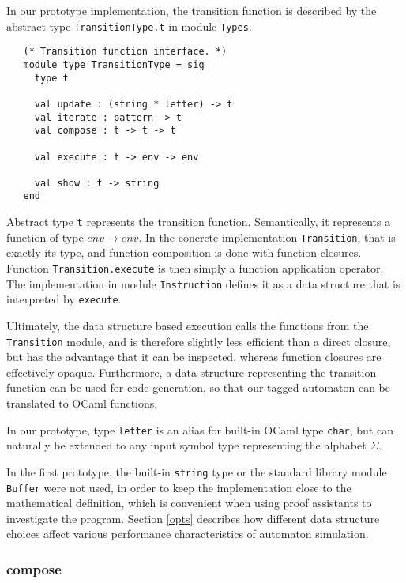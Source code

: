 In our prototype implementation, the transition function is described by the
abstract type \texttt{TransitionType.t} in module \texttt{Types}.

\begin{lstlisting}
   (* Transition function interface. *)
   module type TransitionType = sig
     type t

     val update : (string * letter) -> t
     val iterate : pattern -> t
     val compose : t -> t -> t

     val execute : t -> env -> env

     val show : t -> string
   end
\end{lstlisting}

Abstract type \texttt{t} represents the transition function. Semantically, it
represents a function of type $\mathit{env} \to \mathit{env}$. In the concrete
implementation \texttt{Transition}, that is exactly its type, and function
composition is done with function closures. Function \texttt{Transition.execute}
is then simply a function application operator. The implementation in module
\texttt{Instruction} defines it as a data structure that is interpreted by
\texttt{execute}.

Ultimately, the data structure based execution calls the functions from the
\texttt{Transition} module, and is therefore slightly less efficient than a
direct closure, but has the advantage that it can be inspected, whereas function
closures are effectively opaque. Furthermore, a data structure representing the
transition function can be used for code generation, so that our tagged
automaton can be translated to OCaml functions.

In our prototype, type \texttt{letter} is an alias for built-in OCaml type
\texttt{char}, but can naturally be extended to any input symbol type
representing the alphabet $\Sigma$.

In the first prototype, the built-in \texttt{string} type or the standard
library module \texttt{Buffer} were not used, in order to keep the
implementation close to the mathematical definition, which is convenient when
using proof assistants to investigate the program. Section \ref{opts} describes
how different data structure choices affect various performance characteristics
of automaton simulation.


\subsubsection{compose}

